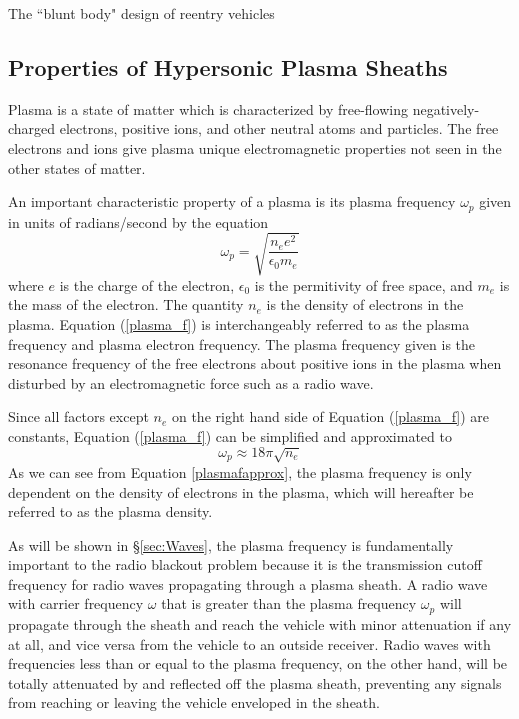 \documentclass[twocolumn]{article}
\begin{document}
The ``blunt body" design of reentry vehicles


\begin{figure}[H]
	\centering
\end{figure}
\subsection*{Properties of Hypersonic Plasma Sheaths}
Plasma is a state of matter which is characterized by free-flowing negatively-charged electrons, positive ions, and other neutral atoms and particles.
The free electrons and ions give plasma unique electromagnetic properties not seen in the other states of matter.

An important characteristic property of a plasma is its plasma frequency $\omega_p$ given in units of radians/second by the equation
\begin{equation} \label{plasma_f}
\omega_p = \sqrt{\frac{n_e e^2}{\epsilon_0 m_e}}
\end{equation}
where $e$ is the charge of the electron, $\epsilon_0$ is the permitivity of free space, and $m_e$ is the mass of the electron. 
The quantity $n_e$ is the density of electrons in the plasma.\cite{chen_introduction_1984,kim_analysis_2008}
Equation (\ref{plasma_f}) is interchangeably referred to as the plasma frequency and plasma electron frequency. The plasma frequency given is the resonance frequency of the free electrons about positive ions in the plasma when disturbed by an electromagnetic force such as a radio wave.\cite{chen_introduction_1984}

Since all factors except $n_e$ on the right hand side of  Equation (\ref{plasma_f}) are constants, Equation (\ref{plasma_f}) can be simplified and approximated to
\begin{equation} \label{plasmafapprox}
\omega_p \approx 18\pi\sqrt{n_e}
\end{equation}
As we can see from Equation \ref{plasmafapprox}, the plasma frequency is only dependent on the density of electrons in the plasma, which will hereafter be referred to as the plasma density.

As will be shown in \S\ref{sec:Waves}, the plasma frequency is fundamentally important to the radio blackout problem because it is the transmission cutoff frequency for radio waves propagating through a plasma sheath.
A radio wave with carrier frequency $\omega$ that is greater than the plasma frequency $\omega_p$ will propagate through the sheath and reach the vehicle with minor attenuation if any at all, and vice versa from the vehicle to an outside receiver.
Radio waves with frequencies less than or equal to the plasma frequency, on the other hand, will be totally attenuated by and reflected off the plasma sheath, preventing any signals from reaching or leaving the vehicle enveloped in the sheath.
\end{document}
